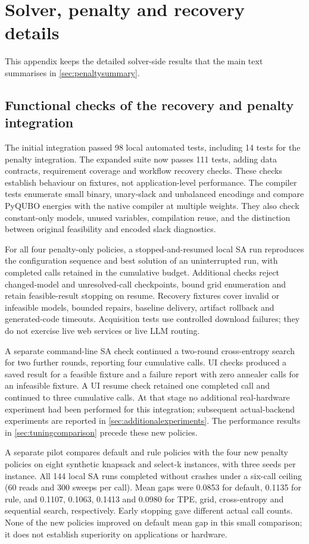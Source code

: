 \section{Solver, penalty and recovery details}
\label{app:details}
This appendix keeps the detailed solver-side results that the main text summarises in \cref{sec:penaltysummary}.

\subsection{Functional checks of the recovery and penalty integration}
\label{sec:integrationchecks}
The initial integration passed 98 local automated tests, including 14 tests for the penalty integration.
The expanded suite now passes 111 tests, adding data contracts, requirement coverage and workflow recovery checks.
These checks establish behaviour on fixtures, not application-level performance. The compiler tests enumerate
small binary, unary-slack and unbalanced encodings and compare PyQUBO energies with the native compiler at
multiple weights. They also check constant-only models, unused variables, compilation reuse, and the distinction
between original feasibility and encoded slack diagnostics.

For all four penalty-only policies, a stopped-and-resumed local SA run reproduces the configuration sequence
and best solution of an uninterrupted run, with completed calls retained in the cumulative budget. Additional
checks reject changed-model and unresolved-call checkpoints, bound grid enumeration and retain feasible-result
stopping on resume. Recovery fixtures cover invalid or infeasible models, bounded repairs, baseline delivery,
artifact rollback and generated-code timeouts. Acquisition tests use controlled download failures; they do not
exercise live web services or live LLM routing.

A separate command-line SA check continued a two-round cross-entropy search for two further rounds, reporting
four cumulative calls. UI checks produced a saved result for a feasible fixture and a failure report with zero
annealer calls for an infeasible fixture. A UI resume check retained one completed call and continued to
three cumulative calls. At that stage no additional real-hardware experiment had been performed for this integration;
subsequent actual-backend experiments are reported in \cref{sec:additionalexperiments}.
The performance results in \cref{sec:tuningcomparison} precede these new policies.

A separate pilot compares default and rule policies with the four new penalty policies on eight synthetic
knapsack and select-k instances, with three seeds per instance. All 144 local SA runs completed without
crashes under a six-call ceiling (60 reads and 300 sweeps per call). Mean gaps were 0.0853 for default,
0.1135 for rule, and 0.1107, 0.1063, 0.1413 and 0.0980 for TPE, grid, cross-entropy and sequential search,
respectively. Early stopping gave different actual call counts. None of the new policies improved on
default mean gap in this small comparison; it does not establish superiority on applications or hardware.

